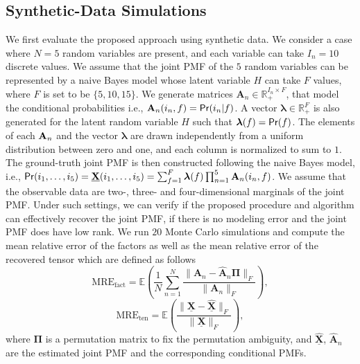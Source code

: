 \documentclass[journal]{IEEEtran}
\begin{document}
\subsection{Synthetic-Data Simulations}
We first evaluate the proposed approach using synthetic data. 
We consider a case where $N=5$ random variables are present, and each variable can take $I_n=10$ discrete values.
We assume that the joint PMF of the $5$ random variables can be represented by a naive Bayes model whose latent variable $H$ can take $F$ values, where $F$ is set to be $\{5,10,15\}$. 
We generate matrices $\mathbf{A}_n \in \mathbb{R}_+^{I_n \times F}$, that model the conditional probabilities i.e., ${\bf A}_n(i_n,f)={\sf Pr}(i_n|f)$.
A vector $\boldsymbol{\lambda} \in \mathbb{R}_+^F$ is also generated for the latent random variable $H$ such that ${\bm \lambda}(f)={\sf Pr}(f)$.
The elements of each ${\bf A}_n$ and the vector $\boldsymbol{\lambda}$ are drawn  { independently} from a uniform distribution between zero and one, and each column is normalized to sum to $1$. The ground-truth joint PMF is then constructed following the naive Bayes model, i.e., ${\sf Pr}(i_1,\ldots,i_5)=\underline{\mathbf{X}}(i_1,\ldots,i_5) = \sum_{f=1}^F \boldsymbol{\lambda}(f)  \prod_{n=1}^5 \mathbf{A}_n(i_n,f)$. We assume that the observable data are  {two-, three- and four-dimensional} marginals of the joint PMF.
Under such settings, we can verify if the proposed procedure and algorithm can effectively recover the joint PMF, if there is no modeling error and the joint PMF does have low rank.
We run $20$ Monte Carlo simulations and compute the mean relative error of the factors as well as the mean relative error of the recovered tensor which are defined as follows
\begin{equation*}
\textrm{MRE} _{\textrm{fact}}= \mathbb{E}\left( \frac{1}{N}  \sum_{n=1}^{N} \frac{ \| {\mathbf{A}}_n -  \widehat{{\mathbf{A}}}_n{\bm \Pi} \|_F}{ \| {\mathbf{A}}_n \|_F}\right),
\end{equation*}
\begin{equation*}
\textrm{MRE}_{\textrm{ten}} =  \mathbb{E}\left(\frac{ \| \underline{\mathbf{X}} - \widehat{\underline{\mathbf{X}}} \|_F}{ \| \underline{\mathbf{X}} \|_F}\right),
\end{equation*}
where ${\bm \Pi}$ is a permutation matrix to fix the permutation ambiguity,  and $\widehat{\underline{\mathbf{X}}}$,  $\widehat{{\mathbf{A}}}_n$ are the estimated joint PMF and the corresponding conditional PMFs.
\end{document}

